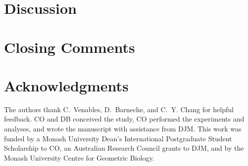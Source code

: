 \documentclass[11pt]{article}
\begin{document}
\section*{Discussion}




\section*{Closing Comments}



\section*{Acknowledgments}
The authors thank C.~Venables, D.~Barneche, and C.~Y. Chang for helpful feedback. CO and DB conceived the study, CO performed the experiments and analyses, and wrote the manuscript with assistance from DJM. This work was funded by a Monash University Dean's International Postgraduate Student Scholarship to CO, an Australian Research Council grants to DJM, and by the Monash University Centre for Geometric Biology.

\newpage{}


\end{document}
